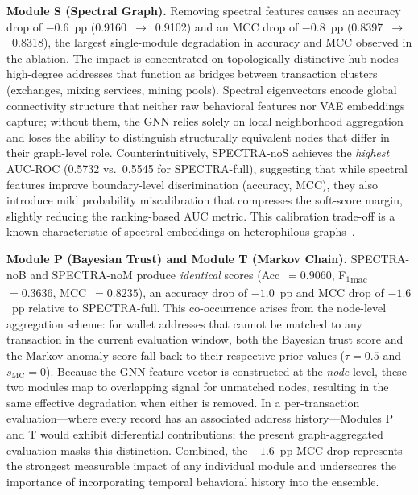\documentclass[journal]{IEEEtran}
\begin{document}
\noindent\textbf{Module S (Spectral Graph).}
Removing spectral features causes an accuracy drop of $-0.6$~pp
(0.9160~$\to$~0.9102) and an MCC drop of $-0.8$~pp (0.8397~$\to$~0.8318),
the largest single-module degradation in accuracy and MCC observed in the
ablation.
The impact is concentrated on topologically distinctive hub nodes—high-degree
addresses that function as bridges between transaction clusters (exchanges,
mixing services, mining pools).
Spectral eigenvectors encode global connectivity structure that neither raw
behavioral features nor VAE embeddings capture; without them, the GNN relies
solely on local neighborhood aggregation and loses the ability to
distinguish structurally equivalent nodes that differ in their graph-level
role.
Counterintuitively, SPECTRA-noS achieves the \emph{highest} AUC-ROC
(0.5732 vs.\ 0.5545 for SPECTRA-full), suggesting that while spectral
features improve boundary-level discrimination (accuracy, MCC), they also
introduce mild probability miscalibration that compresses the soft-score
margin, slightly reducing the ranking-based AUC metric.
This calibration trade-off is a known characteristic of spectral embeddings
on heterophilous graphs~\cite{Zhu2020}.

\noindent\textbf{Module P (Bayesian Trust) and Module T (Markov Chain).}
SPECTRA-noB and SPECTRA-noM produce \emph{identical} scores
(Acc~$= 0.9060$, F$_1$\textsubscript{mac}~$= 0.3636$,
MCC~$= 0.8235$), an accuracy drop of $-1.0$~pp and MCC drop of $-1.6$~pp
relative to SPECTRA-full.
This co-occurrence arises from the node-level aggregation scheme:
for wallet addresses that cannot be matched to any transaction in the
current evaluation window, both the Bayesian trust score and the Markov
anomaly score fall back to their respective prior values ($\tau = 0.5$
and $s_{\text{MC}} = 0$).
Because the GNN feature vector is constructed at the \emph{node} level,
these two modules map to overlapping signal for unmatched nodes,
resulting in the same effective degradation when either is removed.
In a per-transaction evaluation—where every record has an associated
address history—Modules P and T would exhibit differential contributions;
the present graph-aggregated evaluation masks this distinction.
Combined, the $-1.6$~pp MCC drop represents the strongest measurable
impact of any individual module and underscores the importance of
incorporating temporal behavioral history into the ensemble.
\end{document}
